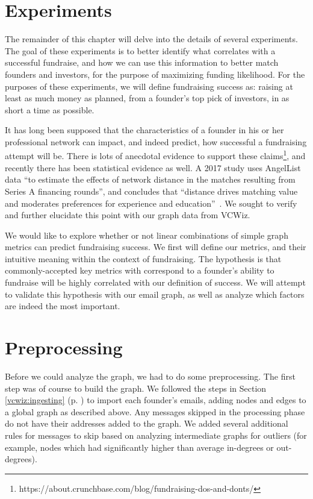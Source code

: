 \section{Experiments}

The remainder of this chapter will delve into the details of several experiments. The goal of these experiments is to better identify what correlates with a successful fundraise, and how we can use this information to better match founders and investors, for the purpose of maximizing funding likelihood. For the purposes of these experiments, we will define fundraising success as: raising at least as much money as planned, from a founder's top pick of investors, in as short a time as possible.

It has long been supposed that the characteristics of a founder in his or her professional network can impact, and indeed predict, how successful a fundraising attempt will be. There is lots of anecdotal evidence to support these claims\footnote{https://about.crunchbase.com/blog/fundraising-dos-and-donts/}, and recently there has been statistical evidence as well. A 2017 study uses AngelList data ``to estimate the effects of network distance in the matches resulting from Series A financing rounds'', and concludes that ``distance drives matching value and moderates preferences for experience and education''~\cite{pasquini2017matching}. We sought to verify and further elucidate this point with our graph data from VCWiz.

We would like to explore whether or not linear combinations of simple graph metrics can predict fundraising success. We first will define our metrics, and their intuitive meaning within the context of fundraising. The hypothesis is that commonly-accepted key metrics with correspond to a founder's ability to fundraise will be highly correlated with our definition of success. We will attempt to validate this hypothesis with our email graph, as well as analyze which factors are indeed the most important.

\section{Preprocessing}

Before we could analyze the graph, we had to do some preprocessing. The first step was of course to build the graph. We followed the steps in Section \ref{vcwiz:ingesting} (p. \pageref{vcwiz:ingesting}) to import each founder's emails, adding nodes and edges to a global graph as described above. Any messages skipped in the processing phase do not have their addresses added to the graph. We added several additional rules for messages to skip based on analyzing intermediate graphs for outliers (for example, nodes which had significantly higher than average in-degrees or out-degrees).

